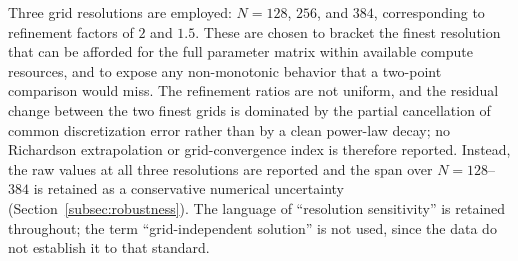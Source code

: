 Three grid resolutions are employed: $N=128$, $256$, and $384$, corresponding to refinement factors of $2$ and $1.5$. These are chosen to bracket the finest resolution that can be afforded for the full parameter matrix within available compute resources, and to expose any non-monotonic behavior that a two-point comparison would miss. The refinement ratios are not uniform, and the residual change between the two finest grids is dominated by the partial cancellation of common discretization error rather than by a clean power-law decay; no Richardson extrapolation or grid-convergence index is therefore reported. Instead, the raw values at all three resolutions are reported and the span over $N=128$--$384$ is retained as a conservative numerical uncertainty (Section~\ref{subsec:robustness}). The language of ``resolution sensitivity'' is retained throughout; the term ``grid-independent solution'' is not used, since the data do not establish it to that standard.

